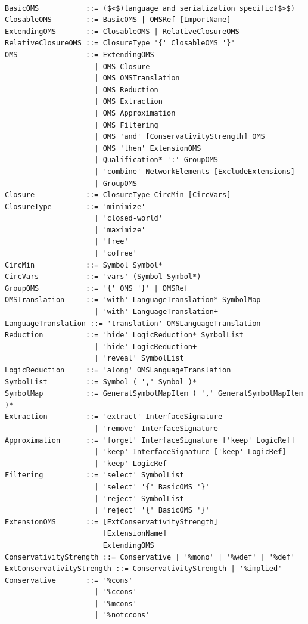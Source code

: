 \documentclass[10pt,fleqn,final]{scrreprt}
\newenvironment{definitions}[0]{\medskip }{}
\begin{document}
\begin{definitions}
\begin{lstlisting}[language=ebnf,escapeinside={()},mathescape]

BasicOMS           ::= ($<$)language and serialization specific($>$) 
ClosableOMS        ::= BasicOMS | OMSRef [ImportName]
ExtendingOMS       ::= ClosableOMS | RelativeClosureOMS
RelativeClosureOMS ::= ClosureType '{' ClosableOMS '}'
OMS                ::= ExtendingOMS
                     | OMS Closure
                     | OMS OMSTranslation
                     | OMS Reduction
                     | OMS Extraction
                     | OMS Approximation
                     | OMS Filtering
                     | OMS 'and' [ConservativityStrength] OMS
                     | OMS 'then' ExtensionOMS
                     | Qualification* ':' GroupOMS
                     | 'combine' NetworkElements [ExcludeExtensions]
                     | GroupOMS
Closure            ::= ClosureType CircMin [CircVars]
ClosureType        ::= 'minimize'
                     | 'closed-world'
                     | 'maximize'
                     | 'free'
                     | 'cofree'
CircMin            ::= Symbol Symbol*
CircVars           ::= 'vars' (Symbol Symbol*)
GroupOMS           ::= '{' OMS '}' | OMSRef
OMSTranslation     ::= 'with' LanguageTranslation* SymbolMap
                     | 'with' LanguageTranslation+
LanguageTranslation ::= 'translation' OMSLanguageTranslation
Reduction          ::= 'hide' LogicReduction* SymbolList
                     | 'hide' LogicReduction+
                     | 'reveal' SymbolList
LogicReduction     ::= 'along' OMSLanguageTranslation
SymbolList         ::= Symbol ( ',' Symbol )*
SymbolMap          ::= GeneralSymbolMapItem ( ',' GeneralSymbolMapItem )*
Extraction         ::= 'extract' InterfaceSignature
                     | 'remove' InterfaceSignature
Approximation      ::= 'forget' InterfaceSignature ['keep' LogicRef]
                     | 'keep' InterfaceSignature ['keep' LogicRef]
                     | 'keep' LogicRef
Filtering          ::= 'select' SymbolList
                     | 'select' '{' BasicOMS '}'
                     | 'reject' SymbolList
                     | 'reject' '{' BasicOMS '}'
ExtensionOMS       ::= [ExtConservativityStrength]
                       [ExtensionName]
                       ExtendingOMS
ConservativityStrength ::= Conservative | '%mono' | '%wdef' | '%def'
ExtConservativityStrength ::= ConservativityStrength | '%implied'
Conservative       ::= '%cons'
                     | '%ccons'
                     | '%mcons'
                     | '%notccons'

\end{lstlisting}
\end{definitions}
\end{document}
